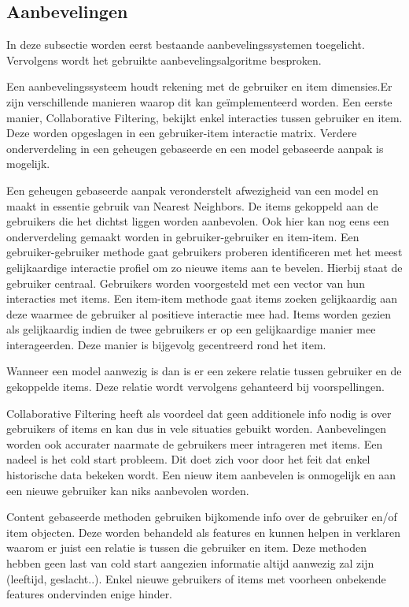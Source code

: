 \subsection{Aanbevelingen}
In deze subsectie worden eerst bestaande aanbevelingssystemen toegelicht. Vervolgens wordt het gebruikte aanbevelingsalgoritme besproken.

Een aanbevelingssysteem houdt rekening met de gebruiker en item dimensies.Er zijn verschillende manieren waarop dit kan geïmplementeerd worden.
Een eerste manier, Collaborative Filtering, bekijkt enkel interacties tussen gebruiker en item. Deze worden opgeslagen in een gebruiker-item interactie matrix. Verdere onderverdeling in een geheugen gebaseerde en een model gebaseerde aanpak is mogelijk. 

Een geheugen gebaseerde aanpak veronderstelt afwezigheid van een model en maakt in essentie gebruik van Nearest Neighbors. De items gekoppeld aan de gebruikers die het dichtst liggen worden aanbevolen. Ook hier kan nog eens een onderverdeling gemaakt worden in gebruiker-gebruiker en item-item.
Een gebruiker-gebruiker methode gaat gebruikers proberen identificeren met het meest gelijkaardige interactie profiel om zo nieuwe items aan te bevelen. Hierbij staat de gebruiker centraal. Gebruikers worden voorgesteld met een vector van hun interacties met items.
Een item-item methode gaat items zoeken gelijkaardig aan deze waarmee de gebruiker al positieve interactie mee had. Items worden gezien als gelijkaardig indien de twee gebruikers er op een gelijkaardige manier mee interageerden. Deze manier is bijgevolg gecentreerd rond het item.

Wanneer een model aanwezig is dan is er een zekere relatie tussen gebruiker en de gekoppelde items. Deze relatie wordt vervolgens gehanteerd bij voorspellingen.

Collaborative Filtering heeft als voordeel dat geen additionele info nodig is over gebruikers of items en kan dus in vele situaties gebuikt worden. Aanbevelingen worden ook accurater naarmate de gebruikers meer intrageren met items. Een nadeel is het cold start probleem. Dit doet zich voor door het feit dat enkel historische data bekeken wordt. Een nieuw item aanbevelen is onmogelijk en aan een nieuwe gebruiker kan niks aanbevolen worden. 

Content gebaseerde methoden gebruiken bijkomende info over de gebruiker en/of item objecten. Deze worden behandeld als features en kunnen helpen in verklaren waarom er juist een relatie is tussen die gebruiker en item. Deze methoden hebben geen last van cold start aangezien informatie altijd aanwezig zal zijn (leeftijd, geslacht..). Enkel nieuwe gebruikers of items met voorheen onbekende features ondervinden enige hinder.

